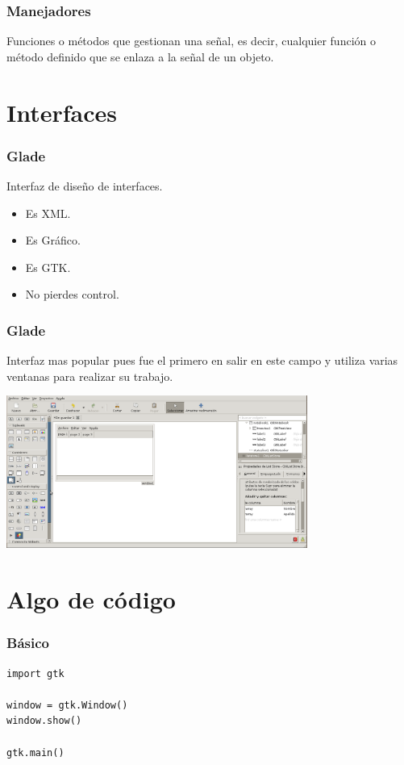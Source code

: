 \documentclass[10pt]{beamer}
\begin{document}
  \begin{frame}[containsverbatim]
    \frametitle{Manejadores}
  
    Funciones o métodos que gestionan una señal, es decir, cualquier función o
    método definido que se enlaza a la señal de un objeto.
  \end{frame}

  \section{Interfaces}
  
  \begin{frame}[containsverbatim]
    \frametitle{Glade}

    Interfaz de diseño de interfaces.
    \begin{itemize}
      \item Es XML.
      \item Es Gráfico.
      \item Es GTK.
      \item No pierdes control.
    \end{itemize}

  \end{frame}
  
  \begin{frame}[containsverbatim]
    \frametitle{Glade}
    Interfaz mas popular pues fue el primero en salir en este campo y utiliza
    varias ventanas para realizar su trabajo.
    \begin{center}
      \includegraphics[height=5cm]{glade_shot.png}
    \end{center}
  \end{frame}
  
  \section{Algo de código}
  
  \begin{frame}[containsverbatim]
    \frametitle{Básico}
    \begin{verbatim}
import gtk

window = gtk.Window()
window.show()

gtk.main()
    \end{verbatim}
  \end{frame}
  
\end{document}
